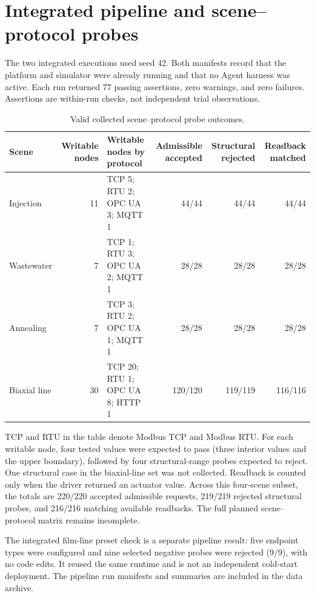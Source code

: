 \documentclass[10pt]{article}
\begin{document}
\section*{Integrated pipeline and scene--protocol probes}
The two integrated executions used seed 42. Both manifests record that the platform and simulator were already running and that no Agent harness was active. Each run returned 77 passing assertions, zero warnings, and zero failures. Assertions are within-run checks, not independent trial observations.

\begin{table}[h]
\centering
\caption{Valid collected scene--protocol probe outcomes.}
\footnotesize
\setlength{\tabcolsep}{3pt}
\begin{tabularx}{\textwidth}{@{}>{\raggedright\arraybackslash}p{2.0cm}r X r r r@{}}
\toprule
Scene & Writable nodes & Writable nodes by protocol & Admissible accepted & Structural rejected & Readback matched \\
\midrule
Injection & 11 & TCP 5; RTU 2; OPC UA 3; MQTT 1 & 44/44 & 44/44 & 44/44 \\
Wastewater & 7 & TCP 1; RTU 3; OPC UA 2; MQTT 1 & 28/28 & 28/28 & 28/28 \\
Annealing & 7 & TCP 3; RTU 2; OPC UA 1; MQTT 1 & 28/28 & 28/28 & 28/28 \\
Biaxial line & 30 & TCP 20; RTU 1; OPC UA 8; HTTP 1 & 120/120 & 119/119 & 116/116 \\
\bottomrule
\end{tabularx}
\end{table}

TCP and RTU in the table denote Modbus TCP and Modbus RTU. For each writable node, four tested values were expected to pass (three interior values and the upper boundary), followed by four structural-range probes expected to reject. One structural case in the biaxial-line set was not collected. Readback is counted only when the driver returned an actuator value. Across this four-scene subset, the totals are 220/220 accepted admissible requests, 219/219 rejected structural probes, and 216/216 matching available readbacks. The full planned scene--protocol matrix remains incomplete.

The integrated film-line preset check is a separate pipeline result: five endpoint types were configured and nine selected negative probes were rejected (9/9), with no code edits. It reused the same runtime and is not an independent cold-start deployment. The pipeline run manifests and summaries are included in the data archive.
\end{document}
